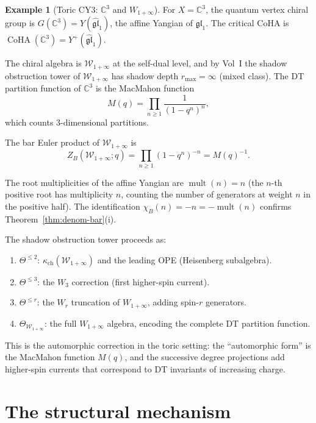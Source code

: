 \documentclass[11pt]{amsart}
\theoremstyle{definition}
\newtheorem{example}[theorem]{Example}
\theoremstyle{remark}
\DeclareMathOperator{\mult}{mult}
\DeclareMathOperator{\CoHA}{CoHA}
\begin{document}
\begin{example}[Toric CY3: $\mathbb{C}^3$ and $W_{1+\infty}$]
\label{ex:c3-bar}
For $X = \mathbb{C}^3$, the quantum vertex chiral group is
$G(\mathbb{C}^3) = Y(\widehat{\mathfrak{gl}}_1)$, the affine
Yangian of $\mathfrak{gl}_1$. The critical CoHA is
$\CoHA(\mathbb{C}^3) = Y^+(\widehat{\mathfrak{gl}}_1)$.

The chiral algebra is $\mathcal{W}_{1+\infty}$ at the self-dual
level, and by Vol~I the shadow obstruction tower of $\mathcal{W}_{1+\infty}$
has shadow depth $r_{\max} = \infty$ (mixed class). The DT
partition function of $\mathbb{C}^3$ is the MacMahon function
\[
 M(q) = \prod_{n \geq 1} \frac{1}{(1 - q^n)^n},
\]
which counts $3$-dimensional partitions.

The bar Euler product of $\mathcal{W}_{1+\infty}$ is
\[
 Z_B(\mathcal{W}_{1+\infty}; q)
 = \prod_{n \geq 1} (1 - q^n)^{-n}
 = M(q)^{-1}.
\]

The root multiplicities of the affine Yangian are
$\mult(n) = n$ (the $n$-th positive root has multiplicity $n$,
counting the number of generators at weight $n$ in the positive
half). The identification $\chi_B(n) = -n = -\mult(n)$
confirms Theorem~\ref{thm:denom-bar}(i).

The shadow obstruction tower proceeds as:
\begin{enumerate}
 \item $\Theta^{\leq 2}$: $\kappa_{\mathrm{ch}}(\mathcal{W}_{1+\infty})$ and
 the leading OPE (Heisenberg subalgebra).
 \item $\Theta^{\leq 3}$: the $W_3$ correction (first
 higher-spin current).
 \item $\Theta^{\leq r}$: the $W_r$ truncation of
 $W_{1+\infty}$, adding spin-$r$ generators.
 \item $\Theta_{\mathcal{W}_{1+\infty}}$: the full
 $W_{1+\infty}$ algebra, encoding the complete DT partition
 function.
\end{enumerate}

This is the automorphic correction in the toric setting: the
``automorphic form'' is the MacMahon function $M(q)$, and the
successive degree projections add higher-spin currents that
correspond to DT invariants of increasing charge.
\end{example}

\section{The structural mechanism}\label{sec:mechanism}
\end{document}
